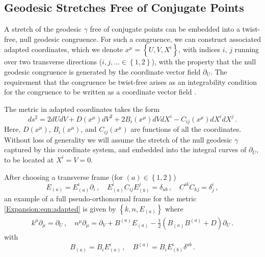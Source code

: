 \subsection{Geodesic Stretches Free of Conjugate Points}\label{Expansion:eqn:curvedlocal}

A stretch of the geodesic $\gamma$ free of conjugate points can be embedded into a twist-free, null geodesic congruence. For such a congruence, we can construct associated adapted coordinates, which we denote $x^{\mu} = \left\lbrace U, V, X^i \right\rbrace$, with indices $i$, $j$ running over two transverse directions ($i,j, \ldots \in \left\lbrace 1, 2 \right \rbrace$), with the property that the null geodesic congruence is generated by the coordinate vector field $\partial_U$. The requirement that the congruence be twist-free arises as an integrability condition for the congruence to be written as a coordinate vector field \cite{penrose1976any}. 

The metric in adapted coordinates takes the form  \cite{penrose1976any}
\begin{equation}\label{Expansion:eqn:adapted}
ds^2 = 2 dU dV + D(x^{\mu}) dV^2 + 2 B_i(x^{\mu}) dV dX^i - C_{ij}(x^{\mu})dX^i dX^j \, .
\end{equation}
Here, $D(x^{\mu})$, $B_i(x^{\mu})$, and $C_{ij}(x^{\mu})$ are functions of all the coordinates. Without loss of generality we will assume the stretch of the null geodesic $\gamma$ captured by this coordinate system, and embedded into the integral curves of $\partial_U$, to be located at $X^i = V = 0$. 

After choosing a transverse frame (for $(a)\in \left\lbrace 1, 2 \right \rbrace$)
\begin{equation}\label{Expansion:eqn:adaptedframetransverse}
E_{(a)} = E^{i}_{(a)} \partial_i \, , \quad E^{i}_{(a)} C_{ij} E^{j}_{(b)} = \delta_{ab} \, , \quad C^{ik}C_{kj} = \delta^i_{j} \, ,
\end{equation}
an example of a full pseudo-orthonormal frame for the metric \eqref{Expansion:eqn:adapted} is given by $\left\lbrace k, n,  E_{(a)} \right\rbrace$  where
\begin{equation}\label{Expansion:eqn:adaptedframe}
\begin{aligned}
k^{\mu}\partial_{\mu} = \partial_U \, , \quad n^{\mu}\partial_{\mu} = \partial_V + B^{(a)}  E_{(a)}- \frac{1}{2}(B_{(a)}  B^{(a)} +D)\partial_U \, .
\end{aligned}
\end{equation}
with
\begin{equation}
B_{(a)} = B_i E^i_{(a)} \, , \quad B^{(a)} = B_i E^i_{(b)}\delta^{ab} \, .
\end{equation}


